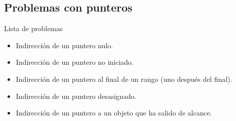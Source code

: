 \subsection{Problemas con punteros}

\begin{frame}[t]{Lista de problemas}
\begin{itemize}
  \item Indirección de un puntero nulo.
  \item Indirección de un puntero no iniciado.
  \item Indirección de un puntero al final de un rango (uno después del final).
  \item Indirección de un puntero desasignado.
  \item Indirección de un puntero a un objeto que ha salido de alcance.
\end{itemize}
\end{frame}
